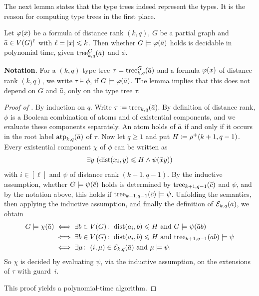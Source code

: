 The next lemma states that the type trees indeed represent the types. It is the reason for computing type trees in the first place.

\begin{lemma}[evaluation]\label{lem:eval}
Let $\varphi(\bar x)$ be a \distFO formula of distance rank $(k,q)$, \(G\) be a partial graph and $\bar a\in V(G)^{\ell}$ with $\ell=|\bar x|\leqslant k$.
Then whether $G\models\varphi(\bar a)$ holds is decidable in polynomial time, given $\mathrm{tree}^G_{k,q}(\bar a)$ and $\phi$.
\end{lemma}

\textbf{Notation.} For a $(k,q)$-type tree $\tau=\mathrm{tree}^G_{k,q}(\bar a)$
and a \distFO formula $\varphi(\bar x)$ of distance rank $(k,q)$,
we write $\tau \models\phi$, if $G\models\varphi(\bar a)$.
The lemma implies that this does not depend on $G$ and $\bar a$, only on the type tree $\tau$.


\begin{proof}[Proof of ]
By induction on $q$.
Write $\tau\coloneqq\mathrm{tree}_{k,q}(\bar a)$.
By definition of distance rank, $\phi$ is a Boolean combination of atoms and of existential components, and we evaluate these components separately.
An atom holds of $\bar a$ if and only if it occurs in the root label $\textnormal{atp}_{k,q}(\bar a)$ of $\tau$.
Now let $q\ge1$ and put $H\coloneqq\rho^+(k+1,q-1)$.
Every existential component $\chi$ of $\phi$ can be written as $$\exists y~(\mathrm{dist}(x_i,y)\leqslant H\land\psi(\bar x y))$$ with $i\in[\ell]$ and $\psi$ of distance rank $(k+1,q-1)$.
By the inductive assumption, whether $G\models\psi(\bar c)$ holds is determined by $\mathrm{tree}_{k+1,q-1}(\bar c)$ and $\psi$, and by the notation above, this holds if $\mathrm{tree}_{k+1,q-1}(\bar c)\models \psi$.
Unfolding the semantics, then applying the inductive assumption, and finally the definition of $\mathcal E_{k,q}(\bar a)$, we obtain
\begin{align*}
G\models\chi(\tup a)
&\iff\exists b\in V(G)\colon\ \dist(a_i,b)\le H\ \text{and}\ G\models\psi(\tup ab)\\
&\iff\exists b\in V(G)\colon\ \dist(a_i,b)\le H\ \text{and}\ \tree_{k+1,q-1}(\tup ab)\models\psi\\
&\iff\exists\mu\colon\ (i,\mu)\in\mathcal E_{k,q}(\tup a)\ \text{and}\ \mu\models\psi.
\end{align*}
So $\chi$ is decided by evaluating $\psi$, via the inductive assumption, on the extensions of $\tau$ with guard~$i$.

This proof yields a polynomial-time algorithm.
\end{proof}

